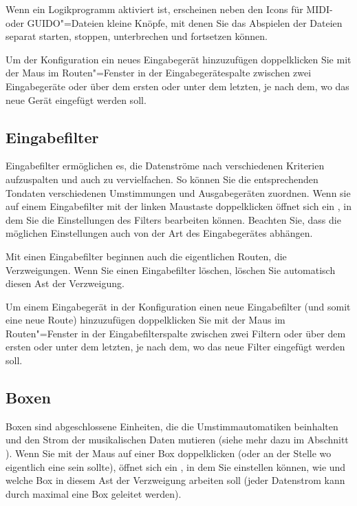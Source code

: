 Wenn ein Logikprogramm aktiviert ist, erscheinen neben den Icons 
für MIDI- oder GUIDO"=Dateien kleine Knöpfe, mit denen Sie 
das Abspielen der Dateien separat starten, stoppen, unterbrechen 
und fortsetzen können.

Um der Konfiguration ein neues Eingabegerät hinzuzufügen 
doppelklicken Sie mit der Maus im Routen"=Fenster in der Eingabegerätespalte 
zwischen zwei Eingabegeräte oder über dem ersten oder unter 
dem letzten, je nach dem, wo das neue Gerät eingefügt werden 
soll.


\subsection{Eingabefilter}\label{sec:eingabefilter}

Eingabefilter ermöglichen es, die Datenströme nach verschiedenen Kriterien 
aufzuspalten und auch zu vervielfachen. So können Sie die entsprechenden 
Tondaten verschiedenen Umstimmungen und Ausgabegeräten zuordnen. 
Wenn sie auf einem Eingabefilter mit der linken Maustaste doppelklicken 
öffnet sich ein , in dem Sie die Einstellungen 
des Filters bearbeiten können. Beachten Sie, dass die möglichen 
Einstellungen auch von der Art des Eingabegerätes abhängen.


Mit einen Eingabefilter beginnen auch die eigentlichen Routen, 
die Verzweigungen. Wenn Sie einen Eingabefilter löschen, löschen 
Sie automatisch diesen Ast der Verzweigung.


Um einem Eingabegerät in der Konfiguration einen neue Eingabefilter 
(und somit eine neue Route) hinzuzufügen doppelklicken Sie 
mit der Maus im Routen"=Fenster in der Eingabefilterspalte zwischen 
zwei Filtern oder über dem ersten oder unter dem letzten, je 
nach dem, wo das neue Filter eingefügt werden soll.

\subsection{Boxen}\label{sec:boxen}


Boxen sind abgeschlossene Einheiten, die die Umstimmautomatiken 
beinhalten und den Strom der musikalischen Daten mutieren (siehe 
mehr dazu im Abschnitt ). Wenn Sie mit 
der Maus auf einer Box doppelklicken (oder an der Stelle wo eigentlich 
eine sein sollte), öffnet sich ein , in dem 
Sie einstellen können, wie und welche Box in diesem Ast der 
Verzweigung arbeiten soll (jeder Datenstrom kann durch maximal 
eine Box geleitet werden).


